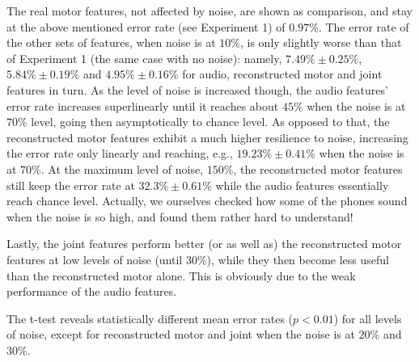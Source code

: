 The real motor features, not affected by noise, are shown as comparison, and stay at
the above mentioned error rate (see Experiment 1) of $0.97\%$. The error rate of the
other sets of features, when noise is at $10\%$, is only slightly worse than that of
Experiment 1 (the same case with no noise): namely,
$7.49\% \pm 0.25\%$, 
$5.84\% \pm 0.19\%$ and 
$4.95\% \pm 0.16\%$ for audio, reconstructed motor and joint features in turn.
As the level of noise is increased though, the audio features' error rate
increases superlinearly until it reaches about $45\%$ when the noise is at $70\%$
level, going then asymptotically to chance level. As opposed to that, the reconstructed
motor features exhibit a much higher resilience to noise, increasing the error rate
only linearly and reaching, e.g., $19.23\% \pm 0.41\%$ when the noise is at $70\%$.
At the maximum level of noise, $150\%$, the reconstructed motor features still keep
the error rate at $32.3\% \pm 0.61\%$ while the audio features essentially reach chance
level. Actually, we ourselves checked how some of the phones sound when the noise is
so high, and found them rather hard to understand!

Lastly, the joint features perform better (or as well as) the reconstructed motor features
at low levels of noise (until $30\%$), while they then become less useful than the
reconstructed motor alone. This is obviously due to the weak performance of the audio
features.

The t-test reveals statistically different mean error rates ($p<0.01$) for all levels of
noise, except for reconstructed motor and joint when the noise is at $20\%$
and $30\%$.
